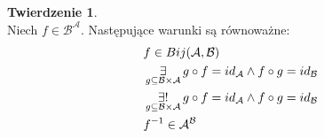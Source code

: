 \documentclass{article}
\theoremstyle{definition}
\newtheorem*{theorem}{Twierdzenie}
\begin{document}
\begin{theorem}\ \\
Niech $f \in \mathcal B ^ \mathcal A$. Następujące warunki są równoważne:
\begin{align}
& f \in Bij(\mathcal A, \mathcal B) \\
& \operatornamewithlimits\exists_
{g \subseteq \mathcal B \times \mathcal A}
g \circ f = id_\mathcal A \land f \circ g = id_\mathcal B \\
& \operatornamewithlimits{\exists!}_
{g \subseteq \mathcal B \times \mathcal A}
g \circ f = id_\mathcal A \land f \circ g = id_\mathcal B \\
& f^{-1} \in \mathcal A ^ \mathcal B
\end{align}
\end{theorem}
\end{document}
